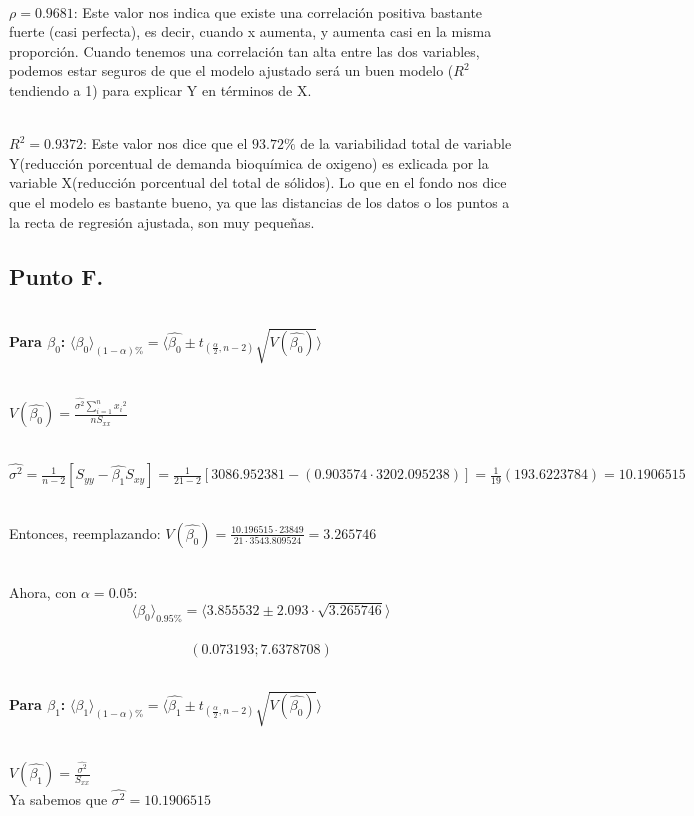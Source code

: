 \documentclass[letterpaper,12pt,onecolumn,titlepage]{article}
\begin{document}
~\\ $\rho=0.9681$: Este valor nos indica que existe una correlaci\'{o}n positiva bastante fuerte (casi perfecta), es decir, cuando x aumenta, y aumenta casi en la misma proporci\'{o}n. Cuando tenemos una correlaci\'{o}n tan alta entre las dos variables, podemos estar seguros de que el modelo ajustado ser\'{a} un buen modelo ($R^2$ tendiendo a 1) para explicar Y en t\'{e}rminos de X.

~\\ $R^2=0.9372$: Este valor nos dice que el $93.72\%$ de la variabilidad total de variable Y(reducci\'{o}n porcentual de demanda bioqu\'{i}mica de oxigeno) es exlicada por la variable X(reducci\'{o}n porcentual del total de s\'{o}lidos). Lo que en el fondo nos dice que el modelo es bastante bueno, ya que las distancias de los datos o los puntos a la recta de regresi\'{o}n ajustada, son muy peque\~{n}as.

\subsection{Punto F.}
~\\ \textbf{Para $\beta_{0}$:} $\langle \beta_{0} \rangle_{(1-\alpha)\%}=\langle \hat{\beta_{0}}\pm t_{(\frac{\alpha}{2},n-2)}\sqrt{V(\hat{\beta_{0}})} \rangle$

~\\ $V(\hat{\beta_{0}})=\frac{\hat{\sigma^2} \sum\limits_{i=1}^{n}{x_{i}}^2}{n S_{xx}}$

~\\ $\hat{\sigma^2}=\frac{1}{n-2}[S_{yy}-\hat{\beta_{1}}S_{xy}]=\frac{1}{21-2}[3086.952381-(0.903574\cdot 3202.095238)]=\frac{1}{19}(193.6223784)=10.1906515$

~\\ Entonces, reemplazando: $V(\hat{\beta_{0}})=\frac{10.196515\cdot 23849}{21\cdot 3543.809524}=3.265746$

~\\ Ahora, con $\alpha=0.05$:
~\\ $$\langle \beta_{0} \rangle_{0.95\%}=\langle 3.855532 \pm 2.093\cdot \sqrt{3.265746} \rangle$$
~\\ $$(0.073193 ; 7.6378708) $$

~\\ \textbf{Para $\beta_{1}$:} $\langle \beta_{1} \rangle_{(1-\alpha)\%}=\langle \hat{\beta_{1}}\pm t_{(\frac{\alpha}{2},n-2)}\sqrt{V(\hat{\beta_{0}})} \rangle$

~\\ $V(\hat{\beta_{1}})=\frac{\hat{\sigma^2}}{S_{xx}}$
~\\ Ya sabemos que $\hat{\sigma^2}=10.1906515$
\end{document}
